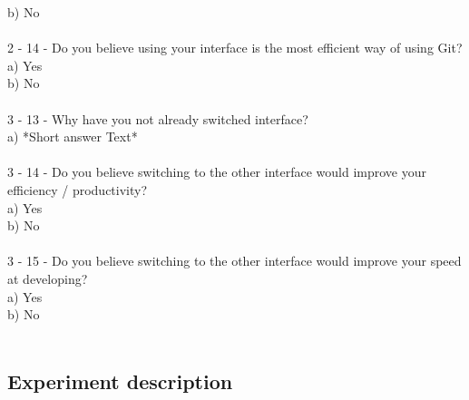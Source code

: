 \documentclass[]{report}
\begin{document}
	b) No\\\\
	2 - 14 - Do you believe using your interface is the most efficient way of using Git?\\
	a) Yes\\
	b) No\\\\
	3 - 13 - Why have you not already switched interface?\\
	a) *Short answer Text*\\\\
	3 - 14 - Do you believe switching to the other interface would improve your efficiency / productivity?\\
	a) Yes\\
	b) No\\\\
	3 - 15 - Do you believe switching to the other interface would improve your speed at developing?\\
	a) Yes\\
	b) No\\\\
	
	\subsection{Experiment description}
	\label{appendix: Experiment description}
	
\end{document}

